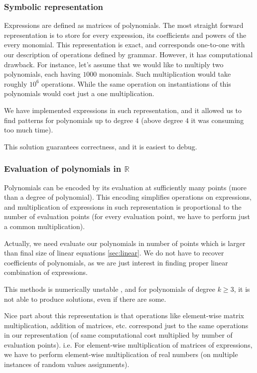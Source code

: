 \subsubsection{Symbolic representation}
Expressions are defined as matrices of polynomials. The most straight forward 
representation is to store for every expression, its coefficients and powers of the every monomial.
This representation is exact, and corresponds one-to-one with our description of operations
defined by grammar. However, it has computational drawback. 
For instance, let's assume that we would like to multiply two polynomials, each having $1000$ monomials.
Such multiplication would take roughly $10^6$ operations. While the same operation on instantiations of
this polynomials would cost just a one multiplication.


We have implemented expressions in such representation, and it allowed us
to find patterns for polynomials up to degree $4$ (above degree $4$ it was consuming too much time).

This solution guarantees correctness, and it is easiest to debug.


\subsubsection{Evaluation of polynomials in $\mathbb{R}$}
Polynomials can be encoded 
by its evaluation at sufficiently many points (more than a degree of polynomial).
This encoding simplifies operations on expressions, and multiplication of expressions
in such representation is proportional to the number of evaluation points (for every evaluation
point, we have to perform just a common multiplication).

Actually, we need evaluate our polynomials in number of points which is larger 
than final size of linear equations \ref{sec:linear}. We do not have to recover coefficients of polynomials,
as we are just interest in finding proper linear combination of expressions.


This methods is numerically unstable
, and for polynomials of degree $k \geq 3$, it is not able to produce solutions, even if there are some.

Nice part about this representation is that operations like element-wise matrix multiplication, addition of matrices, etc.
correspond just to the same operations in our representation (of same computational cost multiplied by number of evaluation points). i.e. 
For element-wise multiplication of matrices of expressions, we
have to perform element-wise multiplication of real numbers (on multiple instances of random values assignments).


